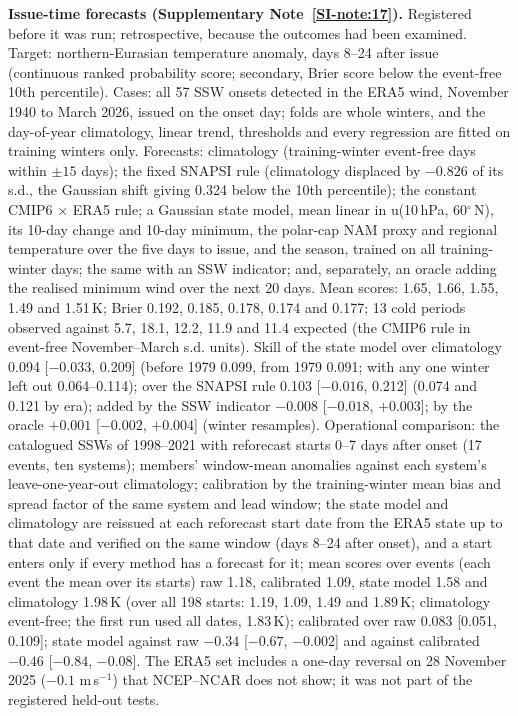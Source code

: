 \documentclass[11pt]{article}
\begin{document}
\textbf{Issue-time forecasts (Supplementary Note~\ref{SI-note:17}).} Registered before it was run; retrospective, because the outcomes had been examined. Target: northern-Eurasian temperature anomaly, days 8–24 after issue (continuous ranked probability score; secondary, Brier score below the event-free 10th percentile). Cases: all 57 SSW onsets detected in the ERA5 wind, November 1940 to March 2026, issued on the onset day; folds are whole winters, and the day-of-year climatology, linear trend, thresholds and every regression are fitted on training winters only. Forecasts: climatology (training-winter event-free days within $\pm15$ days); the fixed SNAPSI rule (climatology displaced by $-0.826$ of its s.d., the Gaussian shift giving 0.324 below the 10th percentile); the constant CMIP6 $\times$ ERA5 rule; a Gaussian state model, mean linear in u(10\,hPa, 60$^\circ$\,N), its 10-day change and 10-day minimum, the polar-cap NAM proxy and regional temperature over the five days to issue, and the season, trained on all training-winter days; the same with an SSW indicator; and, separately, an oracle adding the realised minimum wind over the next 20 days. Mean scores: 1.65, 1.66, 1.55, 1.49 and 1.51\,K; Brier 0.192, 0.185, 0.178, 0.174 and 0.177; 13 cold periods observed against 5.7, 18.1, 12.2, 11.9 and 11.4 expected (the CMIP6 rule in event-free November–March s.d. units). Skill of the state model over climatology 0.094 [$-0.033$, 0.209] (before 1979 0.099, from 1979 0.091; with any one winter left out 0.064–0.114); over the SNAPSI rule 0.103 [$-0.016$, 0.212] (0.074 and 0.121 by era); added by the SSW indicator $-0.008$ [$-0.018$, $+0.003$]; by the oracle $+0.001$ [$-0.002$, $+0.004$] (winter resamples). Operational comparison: the catalogued SSWs of 1998–2021 with reforecast starts 0–7 days after onset (17 events, ten systems); members' window-mean anomalies against each system's leave-one-year-out climatology; calibration by the training-winter mean bias and spread factor of the same system and lead window; the state model and climatology are reissued at each reforecast start date from the ERA5 state up to that date and verified on the same window (days 8–24 after onset), and a start enters only if every method has a forecast for it; mean scores over events (each event the mean over its starts) raw 1.18, calibrated 1.09, state model 1.58 and climatology 1.98\,K (over all 198 starts: 1.19, 1.09, 1.49 and 1.89\,K; climatology event-free; the first run used all dates, 1.83\,K); calibrated over raw 0.083 [0.051, 0.109]; state model against raw $-0.34$ [$-0.67$, $-0.002$] and against calibrated $-0.46$ [$-0.84$, $-0.08$]. The ERA5 set includes a one-day reversal on 28 November 2025 ($-0.1$ m\,s$^{-1}$) that NCEP–NCAR does not show; it was not part of the registered held-out tests.
\end{document}
